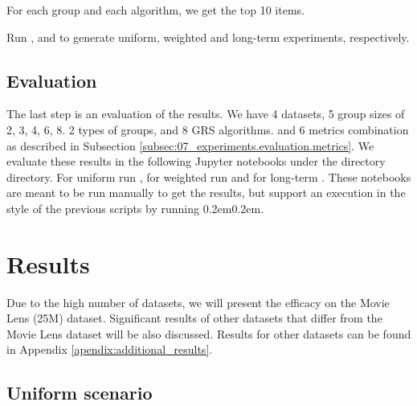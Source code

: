         For each group and each algorithm, we get the top 10 items.

        Run ,
        \newline
         and
        \newline
         to generate uniform, weighted and long-term experiments, respectively.
    
    \subsection{Evaluation}
        The last step is an evaluation of the results. We have 4 datasets, 5 group sizes of 2, 3, 4, 6, 8. 2 types of groups, and 8 GRS algorithms. and 6 metrics combination as described in Subsection \ref{subsec:07_experiments.evaluation.metrics}.
        We evaluate these results in the following Jupyter notebooks under the directory  directory. For uniform run , 
 for weighted run  and for long-term . These notebooks are meant to be run manually to get the results, but support an execution in the style of the previous scripts by running \kern 0.2em\kern 0.2em.
        

\section{Results}

Due to the high number of datasets, we will present the efficacy on the Movie Lens (25M) dataset. Significant results of other datasets that differ from the Movie Lens dataset will be also discussed. Results for other datasets can be found in Appendix \ref{apendix:additional_results}.

\subsection{Uniform scenario} \label{subsec:07_experiments.results.uniform}

